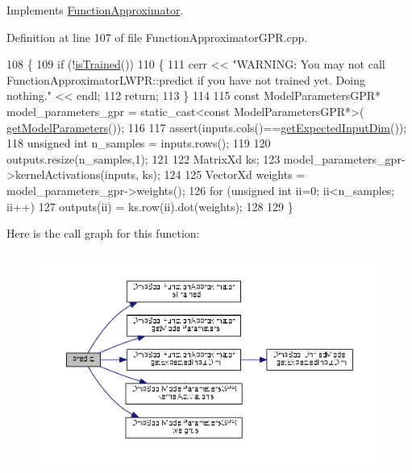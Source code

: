 Implements \hyperlink{classDmpBbo_1_1FunctionApproximator_a0547681a81d4c43ce2601f16047baf7a}{Function\+Approximator}.



Definition at line 107 of file Function\+Approximator\+G\+P\+R.\+cpp.


\begin{DoxyCode}
108 \{
109   \textcolor{keywordflow}{if} (!\hyperlink{classDmpBbo_1_1FunctionApproximator_a178135f623d9b9058870851a53299c6e}{isTrained}())  
110   \{
111     cerr << \textcolor{stringliteral}{"WARNING: You may not call FunctionApproximatorLWPR::predict if you have not trained yet. Doing
       nothing."} << endl;
112     \textcolor{keywordflow}{return};
113   \}
114 
115   \textcolor{keyword}{const} ModelParametersGPR* model\_parameters\_gpr = \textcolor{keyword}{static\_cast<}\textcolor{keyword}{const }ModelParametersGPR*\textcolor{keyword}{>}(
      \hyperlink{classDmpBbo_1_1FunctionApproximator_a0e7e116ed9b159d782fca544dacb4bac}{getModelParameters}());
116   
117   assert(inputs.cols()==\hyperlink{classDmpBbo_1_1FunctionApproximator_af5a550bcf65d5a29a153a594cc4e3fa1}{getExpectedInputDim}());
118   \textcolor{keywordtype}{unsigned} \textcolor{keywordtype}{int} n\_samples = inputs.rows();
119   
120   outputs.resize(n\_samples,1);
121   
122   MatrixXd ks;
123   model\_parameters\_gpr->kernelActivations(inputs, ks);
124   
125   VectorXd weights = model\_parameters\_gpr->weights();
126   \textcolor{keywordflow}{for} (\textcolor{keywordtype}{unsigned} \textcolor{keywordtype}{int} ii=0; ii<n\_samples; ii++)
127     outputs(ii) = ks.row(ii).dot(weights);
128   
129 \}
\end{DoxyCode}


Here is the call graph for this function\+:
\nopagebreak
\begin{figure}[H]
\begin{center}
\leavevmode
\includegraphics[width=350pt]{classDmpBbo_1_1FunctionApproximatorGPR_afe8dcfb9cd065dfde38dce1f6e6cd3e6_cgraph}
\end{center}
\end{figure}



